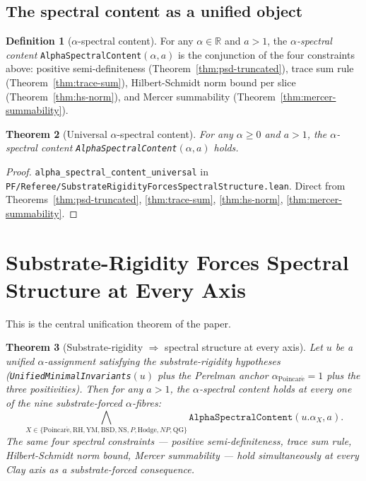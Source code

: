 \documentclass[11pt,a4paper,reqno]{amsart}
\theoremstyle{plain}
\newtheorem{theorem}{Theorem}[section]
\theoremstyle{definition}
\newtheorem{definition}[theorem]{Definition}
\theoremstyle{remark}
\newcommand{\aPo}{\alpha_{\mathrm{Poincar\acute{e}}}}
\newcommand{\code}[1]{\texttt{#1}}
\begin{document}
\subsection{The spectral content as a unified object}
\label{subsec:alpha-spectral-content}

\begin{definition}[$\alpha$-spectral content]
\label{def:alpha-spectral-content}
For any $\alpha \in \mathbb{R}$ and $a > 1$, the \emph{$\alpha$-spectral
content} \code{AlphaSpectralContent}$(\alpha, a)$ is the conjunction of
the four constraints above: positive semi-definiteness
(Theorem~\ref{thm:psd-truncated}), trace sum rule
(Theorem~\ref{thm:trace-sum}), Hilbert-Schmidt norm bound per slice
(Theorem~\ref{thm:hs-norm}), and Mercer summability
(Theorem~\ref{thm:mercer-summability}).
\end{definition}

\begin{theorem}[Universal $\alpha$-spectral content]
\label{thm:alpha-spectral-universal}
For any $\alpha \ge 0$ and $a > 1$, the $\alpha$-spectral content
\code{AlphaSpectralContent}$(\alpha, a)$ holds.
\end{theorem}

\begin{proof}
\code{alpha\_spectral\_content\_universal} in
\code{PF/Referee/SubstrateRigidityForcesSpectralStructure.lean}.
Direct from Theorems~\ref{thm:psd-truncated}, \ref{thm:trace-sum},
\ref{thm:hs-norm}, \ref{thm:mercer-summability}.
\end{proof}

\section{Substrate-Rigidity Forces Spectral Structure at Every Axis}
\label{sec:substrate-spectral-unification}

This is the central unification theorem of the paper.

\begin{theorem}[Substrate-rigidity $\Rightarrow$ spectral structure at every axis]
\label{thm:substrate-spectral-unification}
Let $u$ be a unified $\alpha$-assignment satisfying the
substrate-rigidity hypotheses (\code{UnifiedMinimalInvariants}$(u)$
plus the Perelman anchor $\aPo = 1$ plus the three positivities).
Then for any $a > 1$, the $\alpha$-spectral content holds at every one
of the nine substrate-forced $\alpha$-fibres:
\begin{equation}
\label{eq:nine-axis-spectral}
\bigwedge_{X \in \{\mathrm{Poincar\acute{e}}, \mathrm{RH}, \mathrm{YM},
\mathrm{BSD}, \mathrm{NS}, P, \mathrm{Hodge}, NP, \mathrm{QG}\}}
\code{AlphaSpectralContent}(u.\alpha_{X}, a).
\end{equation}
The same four spectral constraints --- positive semi-definiteness,
trace sum rule, Hilbert-Schmidt norm bound, Mercer summability ---
hold simultaneously at every Clay axis as a substrate-forced
consequence.
\end{theorem}
\end{document}
